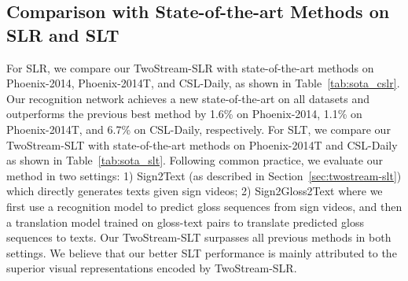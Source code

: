 \documentclass{article}
\begin{document}
\subsection{Comparison with State-of-the-art Methods on SLR and SLT}
For SLR, we compare our TwoStream-SLR with state-of-the-art methods on Phoenix-2014, Phoenix-2014T, and CSL-Daily, as shown in Table~\ref{tab:sota_cslr}. Our recognition network achieves a new state-of-the-art on all datasets and outperforms the previous best method by 1.6\% on Phoenix-2014, 1.1\% on Phoenix-2014T, and 6.7\% on CSL-Daily, respectively. For SLT, we compare our TwoStream-SLT with state-of-the-art methods on Phoenix-2014T and CSL-Daily as shown in Table~\ref{tab:sota_slt}. Following common practice, we evaluate our method in two settings: 1) Sign2Text (as described in Section~\ref{sec:twostream-slt}) which directly generates texts given sign videos; 2) Sign2Gloss2Text where we first use a recognition model to predict gloss sequences from sign videos, and then a translation model trained on gloss-text pairs to translate predicted gloss sequences to texts. Our TwoStream-SLT surpasses all previous methods in both settings. We believe that our better SLT performance is mainly attributed to the superior visual representations encoded by TwoStream-SLR. 
\end{document}
